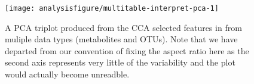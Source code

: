 \begin{figure}[H]
\begin{knitrout}
{\centering \texttt{[image: analysisfigure/multitable-interpret-pca-1]} 

}



\end{knitrout}
\caption{A PCA triplot produced from the CCA selected features in from muliple data types (metabolites and OTUs).
Note that we have departed from our convention of fixing the aspect ratio here as the second axis
represents very little of the variability and the plot would actually become unreadble.}
\label{fig:multitable-interpret-pca}
\end{figure}
